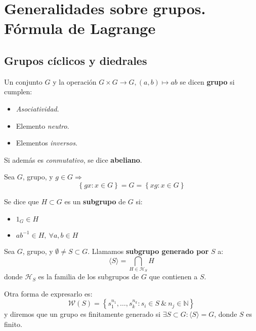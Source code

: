 \chapter{Generalidades sobre grupos.\\ Fórmula de Lagrange}
\section{Grupos cíclicos y diedrales}

\begin{defi}[Grupo]
Un conjunto $G$ y la operación $G \times G \rightarrow G, \left( a, b \right) \mapsto ab$ se dicen \textbf{grupo} si cumplen:
\begin{itemize}
    \item \textit{Asociatividad}.
    \item Elemento \textit{neutro}.
    \item Elementos \textit{inversos}.
\end{itemize}
Si además es \textit{conmutativo}, se dice \textbf{abeliano}.
\end{defi}

\begin{prop}
Sea $G$, grupo, y $g \in G \Rightarrow$
\[
\left\{ gx: x \in G \right\} = G = \left\{ xg : x \in G \right\}
\]
\end{prop}

\begin{defi}[Subgrupo]
Se dice que $H \subset G$ es un \textbf{subgrupo} de $G$ si:
\begin{itemize}
    \item $1_G \in H$
    \item $a b^{-1} \in H,\ \forall a, b \in H$
\end{itemize}
\end{defi}

\begin{defi}
Sea $G$, grupo, y $\emptyset \neq S \subset G$. Llamamos \textbf{subgrupo generado por} $S$ a:
\[
\langle S \rangle = \bigcap_{H \in \mathcal{H}_S} H
\]
donde $\mathcal{H}_S$ es la familia de los subgrupos de $G$ que contienen a $S$.

Otra forma de expresarlo es:
\[
    \mathcal{W}\left( S \right) = \left\{ s_1^{n_1}, \ldots, s_k^{n_k} : s_i \in S\ \&\ n_j \in \mathbb{N} \right\}
\]
y diremos que un grupo es finitamente generado si $\exists S \subset G: \langle S \rangle = G$, donde $S$ es finito.
\end{defi}

